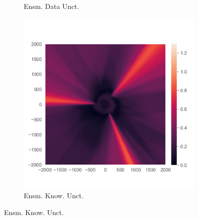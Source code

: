 \begin{figure}
\begin{subfigure}{0.22\textwidth}
  \caption{Ensm. Data Unct.}
  \label{fig:3b}
\end{subfigure}
\begin{subfigure}{0.22\textwidth}
  \centering
  \includegraphics[trim=42 45 15 55, clip, width=\linewidth]{plots/3c.png}
  \caption{Ensm. Know. Unct.}
  \label{fig:3c}
\end{subfigure}%


\end{figure}
